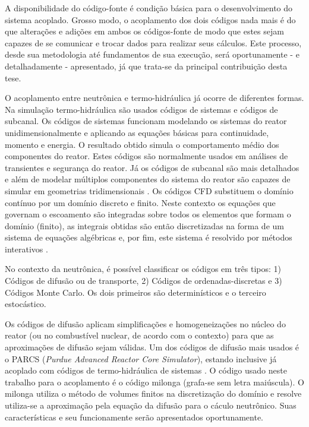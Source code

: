 A disponibilidade do código-fonte é condição básica para o desenvolvimento do sistema acoplado. Grosso modo, o acoplamento
dos dois códigos nada mais é do que alterações e adições em ambos os códigos-fonte de modo
que estes sejam capazes de se comunicar e trocar dados para realizar seus cálculos.
Este processo, desde sua metodologia até fundamentos de sua execução, será
oportunamente - e detalhadamente - apresentado, já que trata-se da principal
contribuição desta tese.

O acoplamento entre neutrônica e termo-hidráulica já ocorre de diferentes formas. Na simulação 
termo-hidráulica são usados códigos de sistemas e códigos de subcanal. Os códigos de sistemas 
funcionam modelando os sistemas do reator unidimensionalmente e aplicando as equações básicas 
para continuidade, momento e energia. O resultado obtido simula o
comportamento médio dos componentes do reator.
Estes códigos são normalmente usados em análises de transientes e segurança do reator. 
Já os códigos de subcanal são mais detalhados e além
de modelar múltiplos componentes do sistema 
do reator são capazes de simular em geometrias tridimensionais \cite{Faghihi2011}. Os códigos 
CFD substituem o domínio contínuo por um domínio discreto e finito. Neste contexto os equações 
que governam o escoamento são integradas sobre todos os elementos que formam o domínio (finito), 
as integrais obtidas são então discretizadas na forma de um sistema de equações algébricas 
e, por fim, este sistema é resolvido por métodos interativos \cite{Versteeg2007}.

No contexto da neutrônica, é possível classificar os códigos em três tipos:
1) Códigos de difusão ou de transporte, 
2) Códigos de ordenadas-discretas e 3) Códigos Monte Carlo. Os dois primeiros são determinísticos 
e o terceiro estocástico. 

Os códigos de difusão aplicam simplificações e homogeneizações no núcleo do reator (ou no combustível nuclear, 
de acordo com o contexto) para que as aproximações de difusão sejam válidas. Um dos códigos de difusão 
mais usados é o PARCS (\textit{Purdue Advanced Reactor Core Simulator}), estando inclusive já acoplado 
com códigos de termo-hidráulica de sistemas \cite{Xu2006,Barber98}.
O código usado neste trabalho para o acoplamento é o código milonga (grafa-se sem letra maiúscula). O milonga \cite{Theler2015}
utiliza o método de volumes finitos na discretização do domínio e resolve utiliza-se a
aproximação pela equação da difusão para o cáculo neutrônico. Suas características e seu
funcionamente serão apresentados oportunamente.

